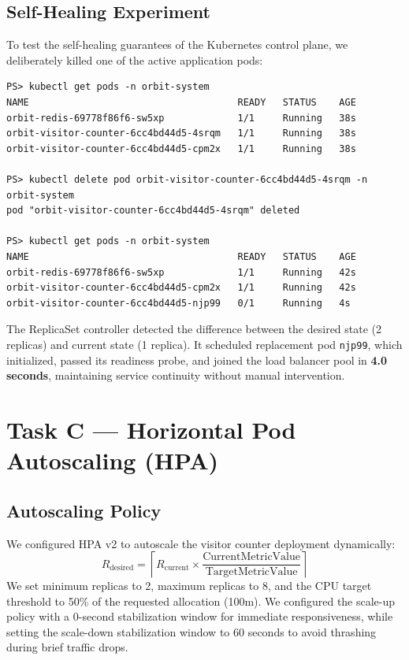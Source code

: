 \documentclass[conference]{IEEEtran}
\begin{document}
\subsection{Self-Healing Experiment}
To test the self-healing guarantees of the Kubernetes control plane, we deliberately killed one of the active application pods:
\begin{lstlisting}[style=ieeecode]
PS> kubectl get pods -n orbit-system
NAME                                     READY   STATUS    AGE
orbit-redis-69778f86f6-sw5xp             1/1     Running   38s
orbit-visitor-counter-6cc4bd44d5-4srqm   1/1     Running   38s
orbit-visitor-counter-6cc4bd44d5-cpm2x   1/1     Running   38s

PS> kubectl delete pod orbit-visitor-counter-6cc4bd44d5-4srqm -n orbit-system
pod "orbit-visitor-counter-6cc4bd44d5-4srqm" deleted

PS> kubectl get pods -n orbit-system
NAME                                     READY   STATUS    AGE
orbit-redis-69778f86f6-sw5xp             1/1     Running   42s
orbit-visitor-counter-6cc4bd44d5-cpm2x   1/1     Running   42s
orbit-visitor-counter-6cc4bd44d5-njp99   0/1     Running   4s
\end{lstlisting}

The ReplicaSet controller detected the difference between the desired state (2 replicas) and current state (1 replica). It scheduled replacement pod \texttt{njp99}, which initialized, passed its readiness probe, and joined the load balancer pool in \textbf{4.0 seconds}, maintaining service continuity without manual intervention.

\section{Task C --- Horizontal Pod Autoscaling (HPA)}

\subsection{Autoscaling Policy}
We configured HPA v2 to autoscale the visitor counter deployment dynamically:
\begin{equation}
R_{\text{desired}} = \left\lceil R_{\text{current}} \times \frac{\text{CurrentMetricValue}}{\text{TargetMetricValue}} \right\rceil
\end{equation}
We set minimum replicas to 2, maximum replicas to 8, and the CPU target threshold to 50\% of the requested allocation (100m). We configured the scale-up policy with a 0-second stabilization window for immediate responsiveness, while setting the scale-down stabilization window to 60 seconds to avoid thrashing during brief traffic drops.
\end{document}
